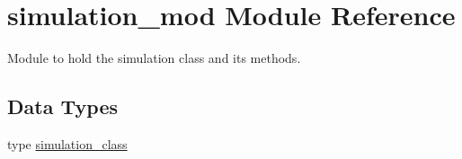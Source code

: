 \hypertarget{namespacesimulation__mod}{}\section{simulation\+\_\+mod Module Reference}
\label{namespacesimulation__mod}


Module to hold the simulation class and its methods.  


\subsection*{Data Types}
\begin{DoxyCompactItemize}
\item 
type \mbox{\hyperlink{structsimulation__mod_1_1simulation__class}{simulation\+\_\+class}}
\end{DoxyCompactItemize}
